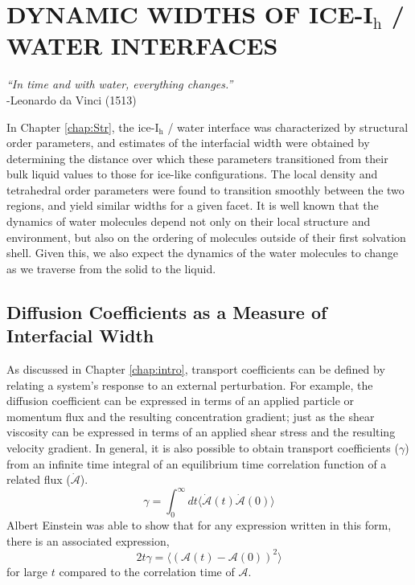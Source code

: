 \chapter{DYNAMIC WIDTHS OF ICE-I$_\mathrm{h}$ / WATER
  INTERFACES}\label{chap:Dyn}

\begin{flushright}
\textit{``In time and with water, everything changes.''} \\
-Leonardo da Vinci (1513) \\
\end{flushright}

In Chapter \ref{chap:Str}, the ice-I$_\mathrm{h}$ / water interface
was characterized by structural order parameters, and estimates of the
interfacial width were obtained by determining the distance over which
these parameters transitioned from their bulk liquid values to those
for ice-like configurations. The local density and tetrahedral order
parameters were found to transition smoothly between the two regions,
and yield similar widths for a given facet.  It is well known that the
dynamics of water molecules depend not only on their local structure
and environment, but also on the ordering of molecules outside of
their first solvation shell. Given this, we also expect the dynamics of the
water molecules to change as we traverse from the solid to the
liquid.

\section{Diffusion Coefficients as a Measure of Interfacial Width}
As discussed in Chapter \ref{chap:intro}, transport coefficients can
be defined by relating a system's response to an external
perturbation. For example, the diffusion coefficient can be expressed
in terms of an applied particle or momentum flux and the resulting
concentration gradient; just as the shear viscosity can be expressed
in terms of an applied shear stress and the resulting velocity
gradient. In general, it is also possible to obtain transport
coefficients ($\gamma$) from an infinite time integral of an
equilibrium time correlation function of a related flux
($\mathscr{\dot{A}}$).
\begin{equation}\label{eq:transport1}
\gamma = \int_0^{\infty} dt \langle \dot{\mathscr{A}}(t)
\dot{\mathscr{A}}(0)\rangle 
\end{equation}
Albert Einstein was able to show that for any expression written in
this form, there is an associated expression,
\begin{equation}\label{eq:transport2}
2t\gamma = \langle (\mathscr{A}(t)-\mathscr{A}(0))^2 \rangle
\end{equation}
for large $t$ compared to the correlation time of $\mathscr{A}$. 

